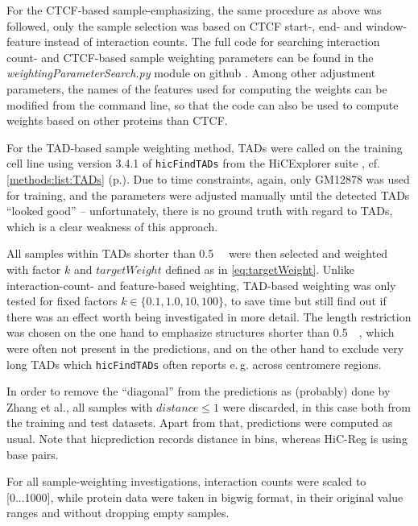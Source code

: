 For the CTCF-based sample-emphasizing, the same procedure as above was followed,
only the sample selection was based on CTCF start-, end- and window-feature instead of interaction counts.
The full code for searching interaction count- and CTCF-based sample weighting parameters
can be found in the \emph{weightingParameterSearch.py} module on github \cite{Krauth2020}.
Among other adjustment parameters, the names of the features used for computing the weights can be modified
from the command line, so that the code can also be used to compute weights based on other proteins than CTCF.

For the TAD-based sample weighting method, TADs were called on the training cell line using 
version 3.4.1 of \texttt{hicFindTADs} from the HiCExplorer suite \cite{Wolff2018}, cf. \autoref{methods:list:TADs} (p.\;\pageref{methods:list:TADs}). 
Due to time constraints, again, only GM12878 was used for training, and the parameters
were adjusted manually until the detected TADs ``looked good'' -- unfortunately, there is 
no ground truth with regard to TADs, which is a clear weakness of this approach. 

All samples within TADs shorter than \SI{0.5}{\mega\bp} were then selected
and weighted with factor $k$ and $targetWeight$ defined as in \autoref{eq:targetWeight}.
Unlike interaction-count- and feature-based weighting, TAD-based weighting was only tested
for fixed factors $k\in\{0.1,1.0,10,100\}$, to save time but still find out if there was an effect 
worth being investigated in more detail.
The length restriction was chosen on the one hand to emphasize structures shorter than \SI{0.5}{\mega\bp}, which were
often not present in the predictions, and on the other hand to exclude very long TADs which
\texttt{hicFindTADs} often reports e.\,g. across centromere regions.

In order to remove the ``diagonal'' from the predictions as (probably) done by Zhang et al.,
all samples with $distance \leq 1$ were discarded, in this case both from the training and test datasets.
Apart from that, predictions were computed as usual.
Note that hicprediction records distance in bins, whereas HiC-Reg is using base pairs.

For all sample-weighting investigations, interaction counts were scaled to [0...1000], 
while protein data were taken in bigwig format, in their original value ranges and without dropping empty samples.

